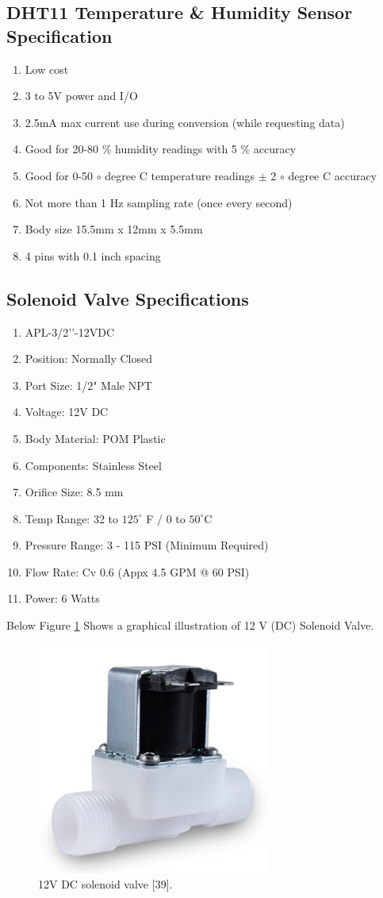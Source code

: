 \subsection{DHT11 Temperature \& Humidity Sensor Specification}
\begin{enumerate}
  \item Low cost
\item 3 to 5V power and I/O
\item 2.5mA max current use during conversion (while requesting data)
\item Good for 20-80 \% humidity readings with 5 \% accuracy
\item Good for 0-50 $\circ$ degree C temperature readings $\pm$ 2 $\circ$ degree C accuracy
\item Not more than 1 Hz sampling rate (once every second)
\item Body size 15.5mm x 12mm x 5.5mm
\item 4 pins with 0.1 inch spacing
\end{enumerate}
\subsection{Solenoid Valve Specifications}
\begin{enumerate}
  \item APL-3/2’’-12VDC
  \item	Position: Normally Closed
  \item	Port Size: 1/2" Male NPT
  \item	Voltage: 12V DC
  \item	Body Material: POM Plastic
  \item	Components: Stainless Steel
  \item	Orifice Size: 8.5 mm
  \item	Temp Range: 32 to $125^{\circ}$ F / 0 to $50^{\circ}$C
  \item	Pressure Range: 3 - 115 PSI (Minimum Required)
  \item	Flow Rate: Cv 0.6 (Appx 4.5 GPM @ 60 PSI)
  \item	Power: 6 Watts
\end{enumerate}


Below Figure \ref{fig8} Shows a graphical illustration of 12 V (DC) Solenoid Valve.
\begin{figure}[h]
  \centering
  \includegraphics[width=3in]{8}
  \caption{12V DC solenoid valve [39].}\label{fig8}
\end{figure}


